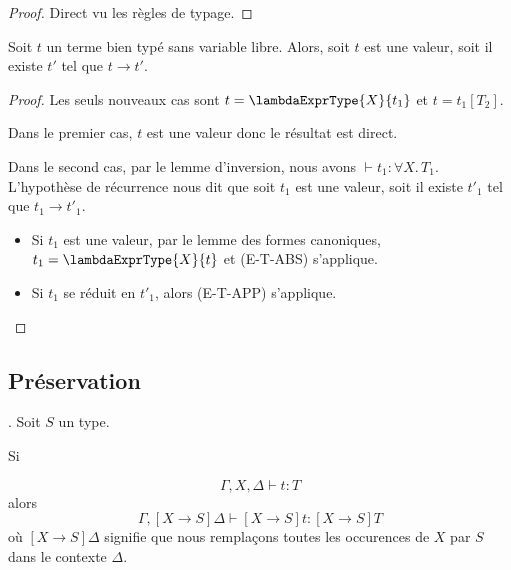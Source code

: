 \begin{proof}
  Direct vu les règles de typage.
\end{proof}

\begin{theorem} [de progression]
  Soit $t$ un terme bien typé sans variable libre. Alors, soit $t$ est une
  valeur, soit il existe $t'$ tel que $t \rightarrow t'$.
\end{theorem}

\begin{proof}
  Les seuls nouveaux cas sont $t = \lambdaExprType{X}{t_{1}}$ et $t =
  t_{1}[T_{2}]$.

  Dans le premier cas, $t$ est une valeur donc le résultat est direct.

  Dans le second cas, par le lemme d'inversion, nous avons $\vdash t_{1} :
  \forall X . \, T_{1}$. L'hypothèse de récurrence nous dit que soit $t_{1}$ est
  une valeur, soit il existe $t'_{1}$ tel que $t_{1} \rightarrow t'_{1}$.

  \begin{itemize}
  \item Si $t_{1}$ est une valeur, par le lemme des formes canoniques, $t_{1} =
    \lambdaExprType{X}{t}$ et (E-T-ABS) s'applique.
  \item Si $t_{1}$ se réduit en $t'_{1}$, alors (E-T-APP) s'applique.
  \end{itemize}
\end{proof}

\subsection*{Préservation}

%
%
%
%  

\begin{lemma} 
  \label{thm:system-f-preservation-substitution-type}.
  Soit $S$ un type.

  Si

  \begin{equation*}
    \Gamma, X, \Delta \vdash t : T
  \end{equation*}
  alors
  \begin{equation*}
    \Gamma, [X \rightarrow S]\Delta \vdash [X \rightarrow S]t : [X \rightarrow S] T 
  \end{equation*}
  où $[X \rightarrow S]\Delta$ signifie que nous remplaçons toutes les
  occurences de $X$ par $S$ dans le contexte $\Delta$.
\end{lemma}


